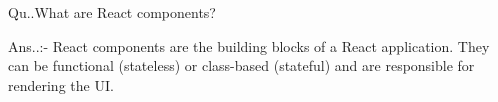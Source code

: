 Qu..What are React components?

Ans..:- React components are the building blocks of a React application. They can be functional (stateless) or class-based (stateful) and are responsible for rendering the UI.